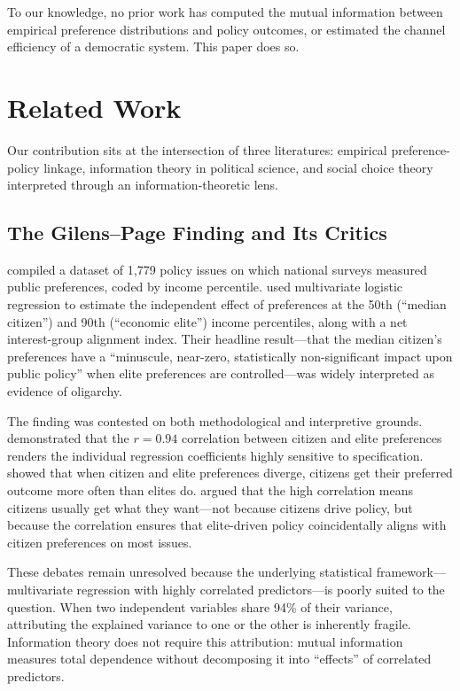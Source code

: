 \documentclass[twocolumn,10pt]{article}
\begin{document}
To our knowledge, no prior work has computed the mutual information between empirical preference distributions and policy outcomes, or estimated the channel efficiency of a democratic system.  This paper does so.

\section{Related Work}
\label{sec:related}

Our contribution sits at the intersection of three literatures: empirical preference-policy linkage, information theory in political science, and social choice theory interpreted through an information-theoretic lens.

\subsection{The Gilens--Page Finding and Its Critics}

\citet{gilens2012} compiled a dataset of 1,779 policy issues on which national surveys measured public preferences, coded by income percentile.  \citet{gilens2014testing} used multivariate logistic regression to estimate the independent effect of preferences at the 50th (``median citizen'') and 90th (``economic elite'') income percentiles, along with a net interest-group alignment index.  Their headline result---that the median citizen's preferences have a ``minuscule, near-zero, statistically non-significant impact upon public policy'' when elite preferences are controlled---was widely interpreted as evidence of oligarchy.

The finding was contested on both methodological and interpretive grounds.  \citet{bashir2015} demonstrated that the $r = 0.94$ correlation between citizen and elite preferences renders the individual regression coefficients highly sensitive to specification.  \citet{branham2017} showed that when citizen and elite preferences diverge, citizens get their preferred outcome more often than elites do.  \citet{enns2015} argued that the high correlation means citizens usually get what they want---not because citizens drive policy, but because the correlation ensures that elite-driven policy coincidentally aligns with citizen preferences on most issues.

These debates remain unresolved because the underlying statistical framework---multivariate regression with highly correlated predictors---is poorly suited to the question.  When two independent variables share 94\% of their variance, attributing the explained variance to one or the other is inherently fragile.  Information theory does not require this attribution: mutual information measures total dependence without decomposing it into ``effects'' of correlated predictors.
\end{document}
